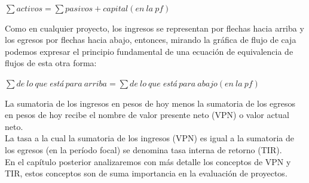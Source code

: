 \begin{center}
   $\sum activos = \sum pasivos + capital(en\ la\ pf)$\\
\end{center}

Como en cualquier proyecto, los ingresos se representan por flechas hacia arriba y los egresos por flechas hacia abajo, entonces, mirando la gráfica de flujo de caja podemos expresar el principio fundamental de una ecuación de equivalencia de flujos de esta otra forma:\\

\begin{center}
   $\sum de\ lo\ que\ $\textit{está}$\ para\ arriba = \sum de\ lo\ que\ $\textit{está}$\ para\ abajo(en\ la\ pf)$\\
\end{center}

La sumatoria de los ingresos en pesos de hoy menos la sumatoria de los egresos en pesos de hoy recibe el nombre de valor presente neto (VPN) o valor actual neto.\\
La tasa a la cual la sumatoria de los ingresos (VPN) es igual a la sumatoria de los egresos (en la período focal) se denomina tasa interna de retorno (TIR).\\
En el capítulo posterior analizaremos con más detalle los conceptos de VPN y TIR, estos conceptos son de suma importancia en la evaluación de proyectos.\\





